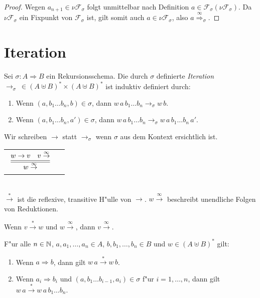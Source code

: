 \documentclass[12pt,a4paper]{article}
\begin{document}
\begin{proof}
  Wegen $a_{n+1}\in\nu\mathcal{F}_\sigma$ folgt unmittelbar nach Definition
  $a \in \mathcal{F}_\sigma(\nu\mathcal{F}_\sigma)$. Da $\nu\mathcal{F}_\sigma$
  ein Fixpunkt von $\mathcal{F}_\sigma$ ist, gilt somit auch $a \in \nu\mathcal{F}_\sigma$, also
  $a \stackrel{\infty}{\Rightarrow}_\sigma$.
\end{proof}


\section{Iteration}

\begin{definition}[Iteration]
  Sei $\sigma: A \Rightarrow B$ ein Rekursionsschema. Die durch $\sigma$ definierte \emph{Iteration}
  $\to_\sigma\ \in (A \uplus B)^* \times (A \uplus B)^*$ ist induktiv definiert durch:
  \begin{enumerate}
  \item Wenn $(a,b_1 \ldots b_n,b) \in \sigma$,
    dann $w\,a\,b_1 \ldots b_n \to_\sigma w\,b$.
  \item Wenn $(a,b_1 \ldots b_n,a') \in \sigma$,
    dann $w\,a\,b_1 \ldots b_n \to_\sigma w\,a\,b_1 \ldots b_n\,a'$.
  \end{enumerate}
\end{definition}
Wir schreiben $\to$ statt $\to_\sigma$ wenn $\sigma$ aus dem Kontext ersichtlich ist.
\\[5mm]
\begin{tabular}{ll}
  $\Rule{w \to v \quad v \stackrel{\infty}{\to}}{w \stackrel{\infty}{\to}}$ 
\end{tabular} \\[5mm]
$\stackrel{*}{\to}$ ist die reflexive, transitive H"ulle von $\to$. $w \stackrel{\infty}{\to}$
beschreibt unendliche Folgen von Reduktionen.

\begin{lemma} \label{lemma:Redex_Star_und_Infty}
  Wenn $v \stackrel{*}{\rightarrow} w$ und $w \stackrel{\infty}{\rightarrow}$,
  dann $v \stackrel{\infty}{\rightarrow}$.
\end{lemma}

\begin{theorem} \label{theorem:Vollstaendigkeit}
  F"ur alle $n \in \mathbb N$, $a,a_1,\ldots,a_n \in A$, $b,b_1,\ldots,b_n \in B$ und $w \in (A \uplus B)^*$ gilt:
  \begin{enumerate}
  \item Wenn $a \Rightarrow b$, dann gilt $w\,a \stackrel{*}{\to} w\,b$.
  \item Wenn $a_i \Rightarrow b_i$ und $(a,b_1 \ldots b_{i-1},a_i) \in \sigma$ f"ur $i=1,\ldots,n$, dann gilt
    $w\,a \stackrel{*}{\to} w\,a\,b_1 \ldots b_n$.
  \end{enumerate}
\end{theorem}
\end{document}
